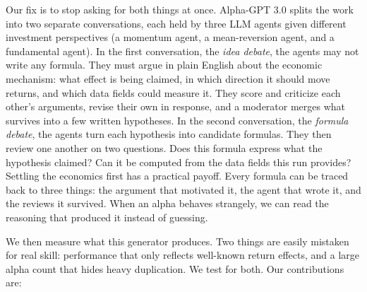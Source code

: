 \documentclass{article}
\theoremstyle{definition}
\theoremstyle{plain}
\theoremstyle{remark}
\begin{document}
Our fix is to stop asking for both things at once. Alpha-GPT 3.0 splits the work into two
separate conversations, each held by three LLM agents given different investment
perspectives (a momentum agent, a mean-reversion agent, and a fundamental agent). In the
first conversation, the \emph{idea debate}, the agents may not write any formula. They
must argue in plain English about the economic mechanism: what effect is being claimed,
in which direction it should move returns, and which data fields could measure it. They
score and criticize each other's arguments, revise their own in response, and a moderator
merges what survives into a few written hypotheses. In the second conversation, the
\emph{formula debate}, the agents turn each hypothesis into candidate formulas. They then
review one another on two questions. Does this formula express what the hypothesis
claimed? Can it be computed from the data fields this run provides? Settling the
economics first has a practical payoff. Every formula can be traced back to three things:
the argument that motivated it, the agent that wrote it, and the reviews it survived.
When an alpha behaves strangely, we can read the reasoning that produced it instead of
guessing.

We then measure what this generator produces. Two things are easily mistaken for real
skill: performance that only reflects well-known return effects, and a large alpha count
that hides heavy duplication. We test for both. Our contributions are:
\end{document}
